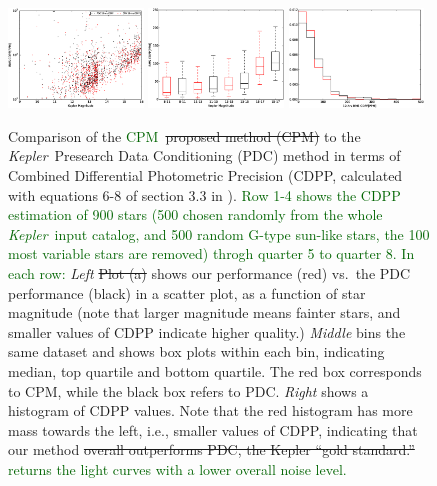 \documentclass[12pt, preprint]{aastex}
\newcommand{\project}[1]{\textsl{#1}}
\newcommand{\Kepler}{\project{Kepler}}
\newcommand{\name}{CPM}
\newcommand{\revise}[1]{\textcolor{darkgreen}{#1}}
\newcommand{\remove}[1]{\sout{#1}}
\begin{document}
\begin{figure}[p]
\begin{center}
\includegraphics[width=0.32\textwidth]{f6j}
\includegraphics[width=0.32\textwidth]{f6k}
\includegraphics[width=0.32\textwidth]{f6l}
\end{center}
\caption{
  \label{cdpp} 
  Comparison of the \revise{\name\ }\remove{proposed method (\name) }to the \Kepler\ Presearch Data Conditioning (PDC) method in terms of Combined Differential Photometric Precision (CDPP, calculated with equations 6-8 of section 3.3 in \citealt{cdpp1}).
  \revise{Row 1-4 shows the CDPP estimation of 900 stars (500 chosen randomly from the whole \Kepler\ input catalog, and 500 random G-type sun-like stars, the 100 most variable stars are removed) throgh quarter 5 to quarter 8. In each row:} 
  \emph{Left} \remove{Plot (a)} shows our performance (red) vs.\ the PDC performance (black) in a scatter plot, as a function of star magnitude (note that larger magnitude means fainter stars, and smaller values of CDPP indicate higher quality.)
  \emph{Middle} bins the same dataset and shows box plots within each bin, indicating median, top quartile and bottom quartile. 
  The red box corresponds to \name, while the black box refers to PDC. 
  \emph{Right} shows a histogram of CDPP values. 
  Note that the red histogram has more mass towards the left, i.e., smaller values of CDPP, 
    indicating that our method \remove{overall outperforms PDC, the Kepler ``gold standard.'' } \revise{returns the light curves with a lower overall noise level.}
}
\end{figure}
\end{document}
